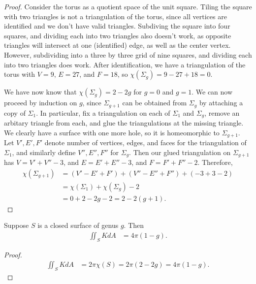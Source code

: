 \begin{proof}
    Consider the torus as a quotient space of the unit square. Tiling the square with two triangles is not a triangulation of the torus, since all vertices are identified and we don't have valid triangles. Subdiving the square into four squares, and dividing each into two triangles also doesn't work, as opposite triangles will intersect at one (identified) edge, as well as the center vertex. However, subdividing into a three by three grid of nine squares, and dividing each into two triangles does work. After identification, we have a triangulation of the torus with $V = 9$, $E = 27$, and $F = 18$, so $\chi(\Sigma_g) = 9 - 27 + 18 = 0$.

    We have now know that $\chi(\Sigma_g) = 2 - 2g$ for $g = 0$ and $g = 1$. We can now proceed by induction on $g$, since $\Sigma_{g+1}$ can be obtained from $\Sigma_g$ by attaching a copy of $\Sigma_1$. In particular, fix a triangulation on each of $\Sigma_1$ and $\Sigma_g$, remove an arbitary triangle from each, and glue the triangulations at the missing triangle. We clearly have a surface with one more hole, so it is homeomorphic to $\Sigma_{g+1}$. Let $V', E', F'$ denote number of vertices, edges, and faces for the triangulation of $\Sigma_1$, and similarly define $V'', E'', F''$ for $\Sigma_g$. Then our glued triangulation on $\Sigma_{g+1}$ has $V = V' + V'' - 3$, and $E = E' + E'' - 3$, and $F = F' + F'' - 2$. Therefore,
    \begin{align*}
        \chi(\Sigma_{g+1}) &= (V' - E' + F') + (V'' - E'' + F'') + (-3 + 3 - 2) \\
        &= \chi(\Sigma_1) + \chi(\Sigma_g) - 2 \\
        &= 0 + 2-2g - 2 = 2-2(g+1).
    \end{align*}
\end{proof}

\begin{cor}
    Suppose $S$ is a closed surface of genus $g$. Then
    \begin{align*}
        \iint_{S}KdA &= 4\pi(1-g).
    \end{align*}
\end{cor}

\begin{proof}
    \begin{align*}
        \iint_{S}KdA &= 2\pi\chi(S) = 2\pi(2-2g) = 4\pi(1-g).
    \end{align*}
\end{proof}

